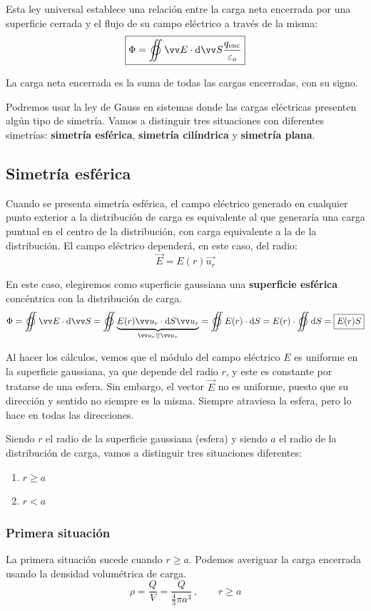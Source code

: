 \documentclass[a4paper]{book}
\begin{document}
Esta ley universal establece una relación entre la carga neta encerrada por una superficie cerrada y el flujo de su campo eléctrico a través de la misma:
\[\boxed{\Phi = \varoiint \vec{E}\cdot \dd\vec{S} \frac{q\subtext{enc}}{\varepsilon_o}}\]

La carga neta encerrada es la suma de todas las cargas encerradas, con su signo.

Podremos usar la ley de Gauss en sistemas donde las cargas eléctricas presenten algún tipo de simetría. Vamos a distinguir tres situaciones con diferentes simetrías: \textbf{simetría esférica}, \textbf{simetría cilíndrica} y \textbf{simetría plana}.

\subsection{Simetría esférica}
Cuando se presenta simetría esférica, el campo eléctrico generado en cualquier punto exterior a la distribución de carga es equivalente al que generaría una carga puntual en el centro de la distribución, con carga equivalente a la de la distribución. El campo eléctrico dependerá, en este caso, del radio:
\[\vec{E}=E(r)\vec{u_r}\]

En este caso, elegiremos como superficie gaussiana una \textbf{superficie esférica} concéntrica con la distribución de carga.
\[\Phi = \varoiint \vec{E}\cdot \dd \vec{S} = \varoiint \underbrace{E(r)\vec{u_r}\cdot \dd S \vec{u_r}}_{\vec{u_r} \parallelvec \vec{u_r}} = \varoiint E(r)\cdot \dd S = E(r)\cdot \varoiint \dd S  = \boxed{E(r)S}\]

Al hacer los cálculos, vemos que el módulo del campo eléctrico $E$ es uniforme en la superficie gaussiana, ya que depende del radio $r$, y este es constante por tratarse de una esfera. Sin embargo, el vector $\vec{E}$ no es uniforme, puesto que su dirección y sentido no siempre es la misma. Siempre atraviesa la esfera, pero lo hace en todas las direcciones.

Siendo $r$ el radio de la superficie gaussiana (esfera) y siendo $a$ el radio de la distribución de carga, vamos a distinguir tres situaciones diferentes:
\begin{enumerate}
	\item $r\geq a$
	\item $r<a$
\end{enumerate}

\subsubsection{Primera situación}
La primera situación sucede cuando $r\geq a$. Podemos averiguar la carga encerrada usando la densidad volumétrica de carga.
\[\rho = \frac{Q}{V} = \frac{Q}{\frac{4}{3}\pi a^3} \, , \qquad r\geq a\]
\end{document}
